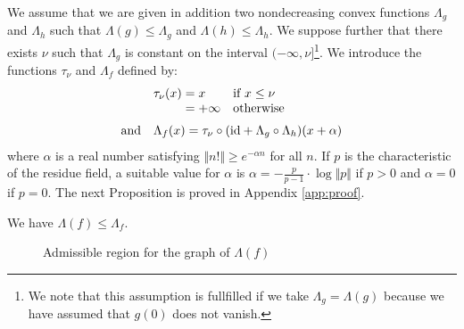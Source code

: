 \documentclass{sig-alternate}
\newcommand{\id}{\textrm{id}}
\begin{document}
We assume that we are given in addition two nondecreasing convex 
functions $\Lambda_g$ and $\Lambda_h$ such that $\Lambda(g) \leq 
\Lambda_g$ and $\Lambda(h) \leq \Lambda_h$. We suppose further that 
there exists $\nu$ such that $\Lambda_g$ is constant on the interval 
$({-}\infty, \nu]$\footnote{We note that this assumption is fullfilled if 
we take $\Lambda_g = \Lambda(g)$ because we have assumed that $g(0)$ 
does not vanish.}. We introduce the functions $\tau_\nu$ and $\Lambda_f$ 
defined by:
$$\begin{array}{rll}
&\tau_\nu(x) = x & \text{if } x \leq \nu \\
& \hphantom{\tau_\nu(x)} = {+} \infty & \text{otherwise} \medskip \\
\text{and} &
\multicolumn{2}{l}{\Lambda_f(x) = 
  \tau_\nu \circ (\id + \Lambda_g \circ \Lambda_h)(x + \alpha)}
\end{array}$$
where $\alpha$ is a real number satisfying $\Vert n! \Vert \geq 
e^{-\alpha n}$ for all $n$. If $p$ is the characteristic of the residue field,
a suitable value for $\alpha$ is $\alpha = - 
\frac p {p-1} \cdot \log \Vert p \Vert$ if $p > 0$ and $\alpha = 0$ if $p = 0$.
The next Proposition is proved in Appendix \ref{app:proof}.

\begin{prop}
\label{prop:boundLambdaf} \label{PROP:BOUNDLAMBDAF}
We have $\Lambda(f) \leq \Lambda_f$.
\end{prop}

\begin{figure}
\null \hfill
{}
\hfill \null

\caption{Admissible region for the graph of $\Lambda(f)$}
\label{fig:area}
\end{figure}
\end{document}
